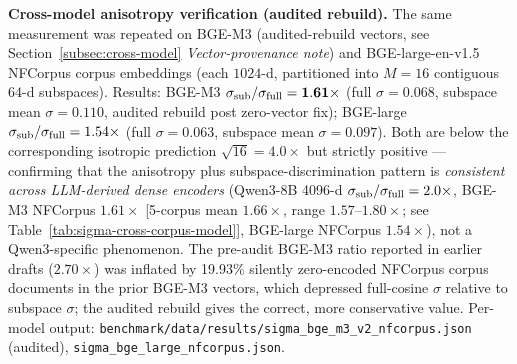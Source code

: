 \documentclass[review,1p]{elsarticle}
\begin{document}
\textbf{Cross-model anisotropy verification (audited rebuild).} The same measurement was repeated on BGE-M3 (audited-rebuild vectors, see Section~\ref{subsec:cross-model} \textit{Vector-provenance note}) and BGE-large-en-v1.5 NFCorpus corpus embeddings (each $1024$-d, partitioned into $M=16$ contiguous $64$-d subspaces). Results: BGE-M3 $\sigma_{\rm sub}/\sigma_{\rm full} = \mathbf{1.61\times}$ (full $\sigma = 0.068$, subspace mean $\sigma = 0.110$, audited rebuild post zero-vector fix); BGE-large $\sigma_{\rm sub}/\sigma_{\rm full} = 1.54\times$ (full $\sigma = 0.063$, subspace mean $\sigma = 0.097$). Both are below the corresponding isotropic prediction $\sqrt{16} = 4.0\times$ but strictly positive --- confirming that the anisotropy plus subspace-discrimination pattern is \emph{consistent across LLM-derived dense encoders} (Qwen3-8B 4096-d $\sigma_{\rm sub}/\sigma_{\rm full} = 2.0\times$, BGE-M3 NFCorpus $1.61\times$ [5-corpus mean $1.66\times$, range $1.57$--$1.80\times$; see Table~\ref{tab:sigma-cross-corpus-model}], BGE-large NFCorpus $1.54\times$), not a Qwen3-specific phenomenon. The pre-audit BGE-M3 ratio reported in earlier drafts ($2.70\times$) was inflated by 19.93\% silently zero-encoded NFCorpus corpus documents in the prior BGE-M3 vectors, which depressed full-cosine $\sigma$ relative to subspace $\sigma$; the audited rebuild gives the correct, more conservative value. Per-model output: \texttt{benchmark/data/results/sigma\_bge\_m3\_v2\_nfcorpus.json} (audited), \texttt{sigma\_bge\_large\_nfcorpus.json}.
\end{document}

